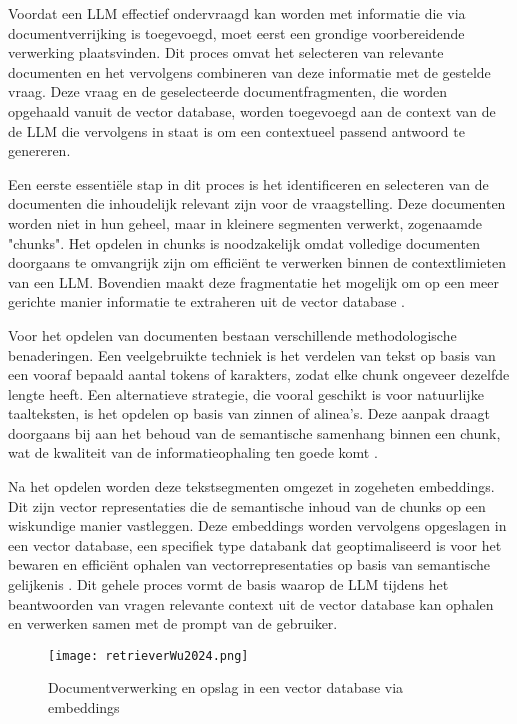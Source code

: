     Voordat een LLM effectief ondervraagd kan worden met informatie die via documentverrijking is toegevoegd, moet eerst een grondige voorbereidende verwerking plaatsvinden. Dit proces omvat het selecteren van relevante documenten en het vervolgens combineren van deze informatie met de gestelde vraag. Deze vraag en de geselecteerde documentfragmenten, die worden opgehaald vanuit de vector database, worden toegevoegd aan de context van de de LLM die vervolgens in staat is om een contextueel passend antwoord te genereren.
    
    Een eerste essentiële stap in dit proces is het identificeren en selecteren van de documenten die inhoudelijk relevant zijn voor de vraagstelling. Deze documenten worden niet in hun geheel, maar in kleinere segmenten verwerkt, zogenaamde "chunks". 
    Het opdelen in chunks is noodzakelijk omdat volledige documenten doorgaans te omvangrijk zijn om efficiënt te verwerken binnen de contextlimieten van een LLM. Bovendien maakt deze fragmentatie het mogelijk om op een meer gerichte manier informatie te extraheren uit de vector database \autocite{wu2025retrievalaugmentedgenerationnaturallanguage}.
    
    Voor het opdelen van documenten bestaan verschillende methodologische benaderingen. Een veelgebruikte techniek is het verdelen van tekst op basis van een vooraf bepaald aantal tokens of karakters, zodat elke chunk ongeveer dezelfde lengte heeft. 
    Een alternatieve strategie, die vooral geschikt is voor natuurlijke taalteksten, is het opdelen op basis van zinnen of alinea's. Deze aanpak draagt doorgaans bij aan het behoud van de semantische samenhang binnen een chunk, wat de kwaliteit van de informatieophaling ten goede komt \autocite{wang2024searchingbestpracticesretrievalaugmented}.
    
    Na het opdelen worden deze tekstsegmenten omgezet in zogeheten embeddings. Dit zijn vector representaties die de semantische inhoud van de chunks op een wiskundige manier vastleggen. Deze embeddings worden vervolgens opgeslagen in een vector database, een specifiek type databank dat geoptimaliseerd is voor het bewaren en efficiënt ophalen van vectorrepresentaties op basis van semantische gelijkenis \autocite{wu2025retrievalaugmentedgenerationnaturallanguage}. Dit gehele proces vormt de basis waarop de LLM tijdens het beantwoorden van vragen relevante context uit de vector database kan ophalen en verwerken samen met de prompt van de gebruiker. %
   
     \begin{figure}[H]
        \centering
        \texttt{[image: retrieverWu2024.png]}
        \caption{Documentverwerking en opslag in een vector database via embeddings \autocite{wu2025retrievalaugmentedgenerationnaturallanguage}}
        \label{fig:RAG opmaken vector database}
    \end{figure}
    
